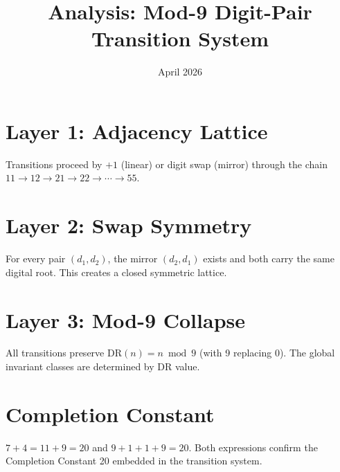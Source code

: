 \documentclass{article}
\title{Analysis: Mod-9 Digit-Pair Transition System}
\date{April 2026}
\begin{document}
\maketitle

\section{Layer 1: Adjacency Lattice}
Transitions proceed by $+1$ (linear) or digit swap (mirror) through the chain $11 \to 12 \to 21 \to 22 \to \cdots \to 55$.

\section{Layer 2: Swap Symmetry}
For every pair $(d_1, d_2)$, the mirror $(d_2, d_1)$ exists and both carry the same digital root. This creates a closed symmetric lattice.

\section{Layer 3: Mod-9 Collapse}
All transitions preserve $\mathrm{DR}(n) = n \bmod 9$ (with 9 replacing 0). The global invariant classes are determined by DR value.

\section{Completion Constant}
$7 + 4 = 11 + 9 = 20$ and $9 + 1 + 1 + 9 = 20$. Both expressions confirm the Completion Constant 20 embedded in the transition system.
\end{document}
